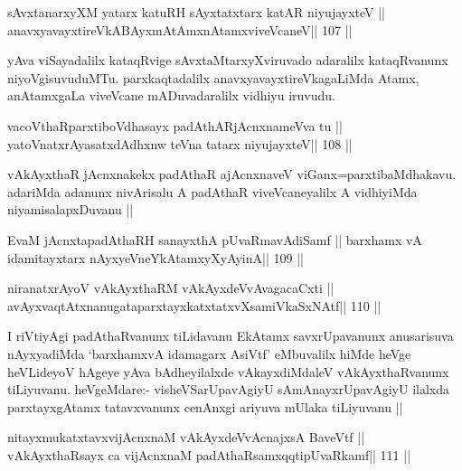 \begin{shl}
sAvxtanarxyXM yatarx katuRH sAyxtatxtarx katAR niyujayxteV ||
\footnotemark[2]anavxyavayxtireVkABAyxmAtAmxnAtamxviveVcaneV\hfill || 107 ||
\end{shl}

\begin{artha}
yAva viSayadalilx kataqRvige sAvxtaMtarxyXviruvado adaralilx
kataqRvanunx niyoVgisuvuduMTu. parxkaqtadalilx
anavxyavayxtireVkagaLiMda Atamx, anAtamxgaLa viveVcane mADuvadaralilx
vidhiyu iruvudu.
\end{artha}


\begin{shl}
vacoVthaRparxtiboVdhasayx padAthARjAcnxnameVva tu ||
yatoV\s natxrAyasatxdAdhxnw teVna tatarx niyujayxteV\hfill || 108 ||
\end{shl}

\begin{artha}
vAkAyxthaR jAcnxnakekx padAthaR ajAcnxnaveV viGanx=parxtibaMdhakavu.
adariMda adanunx nivArisalu A padAthaR viveVcaneyalilx A vidhiyiMda
niyamisalapxDuvanu ||
\end{artha}

\begin{shl}
EvaM jAcnxtapadAthaRH sanayxthA pUvaRmavAdiSamf ||
barxhamx vA idamitayxtarx nAyxyeVneYkAtamxyXyAyinA\hfill || 109 ||
\end{shl}

\begin{shl}
niranatxrAyoV vAkAyxthaRM vAkAyxdeVvAvagacaCxti ||
avAyxvaqtAtxnanugataparxtayxkatxtatxvXsamiVkaSxNAtf\hfill || 110 ||
\end{shl}

\begin{artha}
I riVtiyAgi padAthaRvanunx tiLidavanu EkAtamx savxrUpavanunx
anusarisuva nAyxyadiMda `barxhamxvA idamagarx AsiVtf' eMbuvalilx hiMde
heVge heVLideyoV hAgeye yAva bAdheyilalxde vAkayxdiMdaleV
vAkAyxthaRvanunx tiLiyuvanu. heVgeMdare:- visheVSarUpavAgiyU
sAmAnayxrUpavAgiyU ilalxda parxtayxgAtamx tatavxvanunx cenAnxgi
ariyuva mUlaka tiLiyuvanu ||
\end{artha}


\begin{shl}
nitayxmukatxtavxvijAcnxnaM  \footnotemark[1]vAkAyxdeVvAcnajxsA BaveVtf ||
vAkAyxthaRsayx ca vijAcnxnaM padAthaRsamxqqtipUvaRkamf\hfill || 111 ||
\end{shl}

